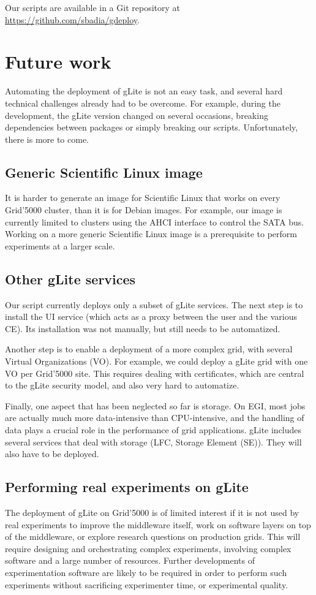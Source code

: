 \documentclass[a4paper, 11pt]{article}
\begin{document}
Our scripts are available in a Git repository at \url{https://github.com/sbadia/gdeploy}.

\section{Future work}

Automating the deployment of gLite is not an easy task, and several hard
technical challenges already had to be overcome.  For example, during the development,
the gLite version changed on several occasions, breaking dependencies between
packages or simply breaking our scripts. Unfortunately, there is more to come.

\subsection*{Generic Scientific Linux image}

It is harder to generate an image for Scientific Linux that works on every
Grid'5000 cluster, than it is for Debian images. For example, our image is
currently limited to clusters using the AHCI interface to control the SATA bus.
Working on a more generic Scientific Linux image is a prerequisite to perform
experiments at a larger scale.

\subsection*{Other gLite services}

Our script currently deploys only a subset of gLite services. The next step is
to install the UI service (which acts as a proxy between the user and the
various CE). Its installation was not manually, but still needs to be
automatized.

Another step is to enable a deployment of a more complex grid, with several
Virtual Organizations (VO). For example, we could deploy a gLite grid with one
VO per Grid'5000 site. This requires dealing with certificates, which are
central to the gLite security model, and also very hard to automatize.

Finally, one aspect that has been neglected so far is storage. On EGI, most
jobs are actually much more data-intensive than CPU-intensive, and the handling
of data plays a crucial role in the performance of grid applications. gLite
includes several services that deal with storage (LFC, Storage Element (SE)).
They will also have to be deployed.

\subsection*{Performing real experiments on gLite}

The deployment of gLite on Grid'5000 is of limited interest if it is not used
by real experiments to improve the middleware itself, work on software layers
on top of the middleware, or explore research questions on production grids.
This will require designing and orchestrating complex experiments, involving
complex software and a large number of resources. Further developments of
experimentation software are likely to be required in order to perform such
experiments without sacrificing experimenter time, or experimental quality.
\end{document}
